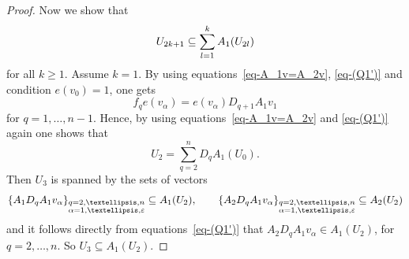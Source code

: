 \documentclass[11pt]{article}
\numberwithin{equation}{section}
\numberwithin{equation}{section}
\begin{document}
\begin{proof}
Now we show that
\begin{equation}
U_{2k+1}\subseteq \sum_{l=1}^{k}A_{1}(U_{2l})
\label{eq-V_(2k+1)-in-imA_{1}}
\end{equation}
for all $k\geq 1$.
Assume $k=1$. By using equations~\eqref{eq-A_1v=A_2v}, \eqref{eq-(Q1')} and condition $e(v_{0})=1$, one gets
\begin{equation*}
f_{q}e(v_{\alpha})=e(v_{\alpha})D_{q+1}A_{1}v_{1}
\end{equation*}
for $q=1,\dots,n-1$. Hence, by using equations~\eqref{eq-A_1v=A_2v} and \eqref{eq-(Q1')} again one shows that
\begin{equation*}
U_{2}= \sum_{q=2}^{n}D_{q}A_{1}(U_{0}) .
\end{equation*}
 Then $U_{3}$ is spanned by the sets of vectors
\begin{equation*}
\{A_{1}D_{q}A_{1}v_{\alpha}\}_{\begin{subarray}{l} q=2,\dots,n \\ \alpha=1,\dots,\varepsilon \end{subarray}}\subseteq A_{1}(U_{2}) ,\qquad
\{A_{2}D_{q}A_{1}v_{\alpha}\}_{\begin{subarray}{l} q=2,\dots,n \\ \alpha=1,\dots,\varepsilon \end{subarray}}\subseteq A_{2}(U_{2})
\end{equation*}
and it follows directly from equations~\eqref{eq-(Q1')} that
$A_{2}D_{q}A_{1}v_{\alpha} \in A_{1}(U_{2})$, for $q=2,\dots,n$. So $U_3\subseteq A_1(U_2)$.


\end{proof}
\end{document}
